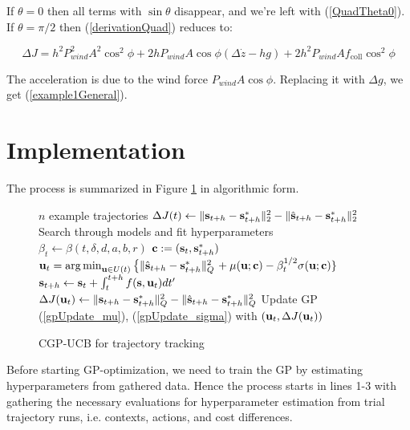 If $\theta = 0$ then all terms with $\sin \theta$ disappear, and we're left with (\ref{QuadTheta0}). If $\theta = \pi/2$ then (\ref{derivationQuad}) reduces to:

\begin{equation}
\Delta J = h^{2}P_{wind}^{2}A^{2}\cos^{2}\phi + 2hP_{wind}A\cos\phi(\Delta \dot{z} - hg) + 2h^{2}P_{wind}Af_{\mathrm{coll}}\cos^{2}\phi
\end{equation}

The acceleration is due to the wind force $P_{wind}A\cos\phi$. Replacing it with $\Delta g$,  we get 
(\ref{example1General}).

\section{Implementation}
\label{Implementation}
The process is summarized in Figure \ref{alg} in algorithmic form.

\begin{figure}[!hbp]
\begin{algorithmic}[1]
\REQUIRE $n$ example trajectories
	\STATE $\Delta J(t) \leftarrow \|\mathbf{s}_{t+h} - \mathbf{s}^{\mathrm{*}}_{t+h}\|_{2}^{2} - \|\hat{\mathbf{s}}_{t+h} - \mathbf{s}^{\mathrm{*}}_{t+h}\|_{2}^{2} $
\ENDFOR
\STATE Search through models and fit hyperparameters
		\STATE $\beta_{t} \leftarrow \beta(t,\delta, d, a, b, r)$
		\STATE $\mathbf{c} := (\mathbf{s}_t, \mathbf{s}^{*}_{t+h})$
		\STATE $\mathbf{u}_{t} = \operatorname*{arg\,min}_{\mathbf{u} \in U(t)} \left\lbrace  \|\hat{\mathbf{s}}_{t+h} - \mathbf{s}^{*}_{t+h}\|_{Q}^{2} \right. 		+ \mu(\mathbf{u};\mathbf{c}) - \beta_t^{1/2}\sigma(\mathbf{u};\mathbf{c}) \rbrace $
		\STATE $\mathbf{s}_{t+h} \leftarrow \mathbf{s}_{t} + \int_{t}^{t+h}f(\mathbf{s},\mathbf{u}_{t})dt'$
		\STATE $\Delta J(\mathbf{u}_{t}) \leftarrow \|\mathbf{s}_{t+h} - \mathbf{s}^{*}_{t+h}\|_{Q}^{2} - \|\hat{\mathbf{s}}_{t+h} - \mathbf{s}^{*}_{t+h}\|_{Q}^{2} $
		\STATE Update GP (\ref{gpUpdate_mu}), (\ref{gpUpdate_sigma}) with $(\mathbf{u}_{t}, \Delta J(\mathbf{u}_{t}))$
	\ENDFOR
\ENDLOOP
\end{algorithmic}
\caption{CGP-UCB for trajectory tracking}
\label{alg}
\end{figure}

Before starting GP-optimization, we need to train the GP by estimating hyperparameters from gathered data. Hence the process starts in lines 1-3 with gathering the necessary evaluations for hyperparameter estimation from trial trajectory runs, i.e. contexts, actions, and cost differences. 


